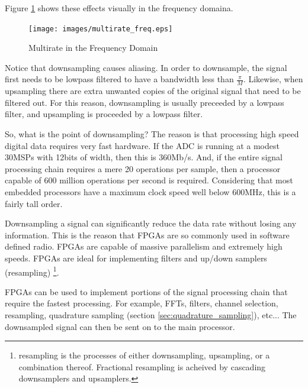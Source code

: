 \documentclass[a4paper, 12pt]{article}
\begin{document}
Figure \ref{fig:multirate_freq} shows these effects visually in the frequency domaina.

\begin{figure}[h]
\caption{Multirate in the Frequency Domain}
\label{fig:multirate_freq}
\centering
\texttt{[image: images/multirate\_freq.eps]}
\end{figure}

Notice that downsampling causes aliasing.  In order to downsample, the signal first needs to be lowpass filtered to have a bandwidth less than $\frac{\pi}{M}$.  Likewise, when upsampling there are extra unwanted copies of the original signal that need to be filtered out.  For this reason, downsampling is usually preceeded by a lowpass filter, and upsampling is proceeded by a lowpass filter.

So, what is the point of downsampling?  The reason is that processing high speed digital data requires very fast hardware.  If the ADC is running at a modest 30MSPs with 12bits of width, then this is 360Mb/s.  And, if the entire signal processing chain requires a mere 20 operations per sample, then a processor capable of 600 million operations per second is required.  Considering that most embedded processors have a maximum clock speed well below 600MHz, this is a fairly tall order.

Downsampling a signal can significantly reduce the data rate without losing any information.  This is the reason that FPGAs are so commonly used in software defined radio.  FPGAs are capable of massive parallelism and extremely high speeds.  FPGAs are ideal for implementing filters and up/down samplers (resampling) \footnote{resampling is the processes of either downsampling, upsampling, or a combination thereof.  Fractional resampling is acheived by cascading downsamplers and upsamplers.}.

FPGAs can be used to implement portions of the signal processing chain that require the fastest processing.  For example, FFTs, filters, channel selection, resampling, quadrature sampling (section \ref{sec:quadrature_sampling}), etc...  The downsampled signal can then be sent on to the main processor.

\end{document}
